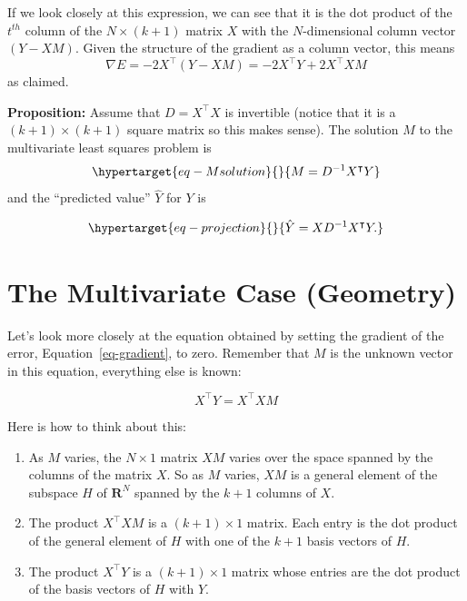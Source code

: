 \documentclass[
  11pt,
  letterpaper,
]{scrbook}
\theoremstyle{plain}
\theoremstyle{remark}
\begin{document}
If we look closely at this expression, we can see that it is the dot
product of the \(t^{th}\) column of the \(N\times (k+1)\) matrix \(X\)
with the \(N\)-dimensional column vector \((Y-XM)\). Given the structure
of the gradient as a column vector, this means \[
\nabla E = -2X^{\intercal}(Y-XM)=-2X^{\intercal}Y+2X^{\intercal}XM
\] as claimed.

\textbf{Proposition:} Assume that \(D=X^{\intercal}X\) is invertible
(notice that it is a \((k+1)\times(k+1)\) square matrix so this makes
sense). The solution \(M\) to the multivariate least squares problem is
\begin{equation}\protect\hypertarget{eq-Msolution}{}{ M =
D^{-1}X^{\intercal}Y }\label{eq-Msolution}\end{equation} and the
``predicted value'' \(\hat{Y}\) for \(Y\) is

\begin{equation}\protect\hypertarget{eq-projection}{}{
\hat{Y} = XD^{-1}X^{\intercal}Y.
}\label{eq-projection}\end{equation}

\hypertarget{the-multivariate-case-geometry}{%
\section{The Multivariate Case
(Geometry)}\label{the-multivariate-case-geometry}}

Let's look more closely at the equation obtained by setting the gradient
of the error, Equation~\ref{eq-gradient}, to zero. Remember that \(M\)
is the unknown vector in this equation, everything else is known:

\[ X^{\intercal}Y = X^{\intercal}XM \]

Here is how to think about this:

\begin{enumerate}
\def\labelenumi{\arabic{enumi}.}
\item
  As \(M\) varies, the \(N\times 1\) matrix \(XM\) varies over the space
  spanned by the columns of the matrix \(X\). So as \(M\) varies, \(XM\)
  is a general element of the subspace \(H\) of \(\mathbf{R}^{N}\)
  spanned by the \(k+1\) columns of \(X\).
\item
  The product \(X^{\intercal}XM\) is a \((k+1)\times 1\) matrix. Each
  entry is the dot product of the general element of \(H\) with one of
  the \(k+1\) basis vectors of \(H\).
\item
  The product \(X^{\intercal}Y\) is a \((k+1)\times 1\) matrix whose
  entries are the dot product of the basis vectors of \(H\) with \(Y\).
\end{enumerate}
\end{document}
